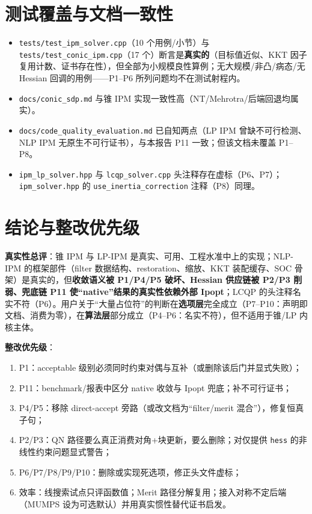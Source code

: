 \documentclass[11pt,a4paper]{ctexart}
\newcommand{\file}[1]{\texttt{#1}}
\newcommand{\opt}[1]{\texttt{#1}}
\begin{document}
\section{测试覆盖与文档一致性}
\begin{itemize}[leftmargin=2em]
  \item \file{tests/test\_ipm\_solver.cpp}（10 个用例/小节）与 \file{tests/test\_conic\_ipm.cpp}（17 个）断言是\textbf{真实的}（目标值近似、KKT 因子复用计数、证书存在性），但全部为小规模良性算例；无大规模/非凸/病态/无 Hessian 回调的用例——P1--P6 所列问题均不在测试射程内。
  \item \file{docs/conic\_sdp.md} 与锥 IPM 实现一致性高（NT/Mehrotra/后端回退均属实）。
  \item \file{docs/code\_quality\_evaluation.md} 已自知两点（LP IPM 曾缺不可行检测、NLP IPM 无原生不可行证书），与本报告 P11 一致；但该文档未覆盖 P1--P8。
  \item \file{ipm\_lp\_solver.hpp} 与 \file{lcqp\_solver.cpp} 头注释存在虚标（P6、P7）；\file{ipm\_solver.hpp} 的 \opt{use\_inertia\_correction} 注释（P8）同理。
\end{itemize}

\section{结论与整改优先级}
\textbf{真实性总评}：锥 IPM 与 LP-IPM 是真实、可用、工程水准中上的实现；NLP-IPM 的框架部件（filter 数据结构、restoration、缩放、KKT 装配缓存、SOC 骨架）是真实的，但\textbf{收敛语义被 P1/P4/P5 破坏、Hessian 供应链被 P2/P3 削弱、兜底链 P11 使``native''结果的真实性依赖外部 Ipopt}；LCQP 的头注释名实不符（P6）。用户关于``大量占位符''的判断在\textbf{选项层}完全成立（P7--P10：声明即文档、消费为零），在\textbf{算法层}部分成立（P4--P6：名实不符），但不适用于锥/LP 内核主体。

\textbf{整改优先级}：
\begin{enumerate}[leftmargin=2em]
  \item P1：acceptable 级别必须同时约束对偶与互补（或删除该后门并显式失败）；
  \item P11：benchmark/报表中区分 native 收敛与 Ipopt 兜底；补不可行证书；
  \item P4/P5：移除 direct-accept 旁路（或改文档为``filter/merit 混合''），修复恒真子句；
  \item P2/P3：QN 路径要么真正消费对角+块更新，要么删除；对仅提供 \opt{hess} 的非线性约束问题显式警告；
  \item P6/P7/P8/P9/P10：删除或实现死选项，修正头文件虚标；
  \item 效率：线搜索试点只评函数值；Merit 路径分解复用；接入对称不定后端（MUMPS 设为可选默认）并用真实惯性替代证书启发。
\end{enumerate}
\end{document}
